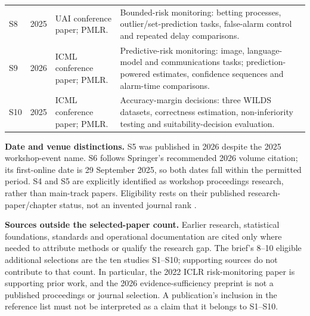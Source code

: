 \documentclass[11pt,a4paper]{article}
\begin{document}
\begin{longtable}{L{0.8cm}L{1.4cm}L{4.5cm}L{9.0cm}}
S8 \cite{timans} & 2025 & UAI conference paper; PMLR. & Bounded-risk monitoring: betting processes, outlier/set-prediction tasks, false-alarm control and repeated delay comparisons.\\[3pt]
S9 \cite{pprm} & 2026 & ICML conference paper; PMLR. & Predictive-risk monitoring: image, language-model and communications tasks; prediction-powered estimates, confidence sequences and alarm-time comparisons.\\[3pt]
S10 \cite{suitability} & 2025 & ICML conference paper; PMLR. & Accuracy-margin decisions: three WILDS datasets, correctness estimation, non-inferiority testing and suitability-decision evaluation.\\
\end{longtable}
\endgroup

\textbf{Date and venue distinctions.} S5 was published in 2026 despite the
2025 workshop-event name. S6 follows Springer's recommended 2026 volume
citation; its first-online date is 29 September 2025, so both dates fall within
the permitted period. S4 and S5 are explicitly identified as workshop
proceedings research, rather than main-track papers. Eligibility rests on
their published research-paper/chapter status, not an invented journal rank
\cite{causal,prodem,batched}.

\textbf{Sources outside the selected-paper count.} Earlier research,
statistical foundations, standards and operational documentation are cited
only where needed to attribute methods or qualify the research gap. The
brief's 8--10 eligible additional selections are the ten studies S1--S10;
supporting sources do not contribute to that count. In particular, the 2022
ICLR risk-monitoring paper is supporting prior work, and
the 2026 evidence-sufficiency preprint is not a published proceedings or
journal selection. A publication's inclusion in the reference list must not
be interpreted as a claim that it belongs to S1--S10.
\end{document}
